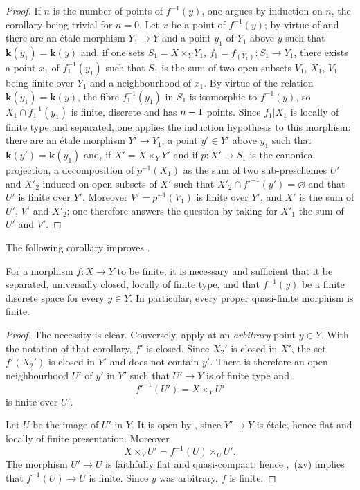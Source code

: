 \begin{proof}
If $n$ is the number of points of $f^{-1}(y)$, one argues by induction on $n$, the corollary being trivial for $n=0$.
Let $x$ be a point of $f^{-1}(y)$; by virtue of  and  there are an \'etale morphism $Y_1\to Y$ and a point $y_1$ of $Y_1$ above $y$ such that $\boldsymbol{k}(y_1)=\boldsymbol{k}(y)$ and, if one sets $S_1=X\times_Y Y_1$, $f_1=f_{(Y_1)}:S_1\to Y_1$, there exists a point $x_1$ of $f_1^{-1}(y_1)$
such that $S_1$ is the sum of two open subsets $V_1$, $X_1$, $V_1$ being finite over $Y_1$ and a neighbourhood of $x_1$.
By virtue of the relation $\boldsymbol{k}(y_1)=\boldsymbol{k}(y)$, the fibre $f_1^{-1}(y_1)$ in $S_1$ is isomorphic to $f^{-1}(y)$, so $X_1\cap f_1^{-1}(y_1)$ is finite, discrete and has $n- 1$ points.
Since $f_1|X_1$ is locally of finite type and separated, one applies the induction hypothesis to this morphism: there are an \'etale morphism $Y'\to Y_1$, a point $y'\in Y'$ above $y_1$ such that $\boldsymbol{k}(y')=\boldsymbol{k}(y_1)$ and, if $X'=X\times_Y Y'$ and if $p:X'\to S_1$ is the canonical projection, a decomposition of $p^{-1}(X_1)$ as the sum of two sub-preschemes $U'$ and $X'_2$ induced on open subsets of $X'$ such that $X'_2\cap f'^{-1}(y')=\varnothing$ and that $U'$ is finite over $Y'$.
Moreover $V'=p^{-1}(V_1)$ is finite over $Y'$, and $X'$ is the sum of $U'$, $V'$ and $X'_2$; one therefore answers the question by taking for $X'_1$ the sum of $U'$ and $V'$.
\end{proof}

The following corollary improves .

\begin{corollary}[18.12.4]
\label{IV.18.12.4}
For a morphism $f:X\to Y$ to be finite, it is necessary and sufficient that it be separated, universally closed, locally of finite type, and that $f^{-1}(y)$ be a finite discrete space for every $y\in Y$. In particular, every proper quasi-finite morphism is finite.
\end{corollary}

\begin{proof}
The necessity is clear. Conversely, apply  at an \emph{arbitrary} point $y\in Y$. With the notation of that corollary, $f'$ is closed. Since $X_2'$ is closed in $X'$, the set $f'(X_2')$ is closed in $Y'$ and does not contain $y'$. There is therefore an open neighbourhood $U'$ of $y'$ in $Y'$ such that $U'\to Y$ is of finite type and
\[
  f'^{-1}(U')=X\times_{Y}U'
\]
is finite over $U'$.

Let $U$ be the image of $U'$ in $Y$. It is open by , since $Y'\to Y$ is \'etale, hence flat and locally of finite presentation. Moreover
\[
  X\times_{Y}U'
  =f^{-1}(U)\times_{U}U'.
\]
The morphism $U'\to U$ is faithfully flat and quasi-compact; hence ,~(xv) implies that $f^{-1}(U)\to U$ is finite. Since $y$ was arbitrary, $f$ is finite.
\end{proof}

